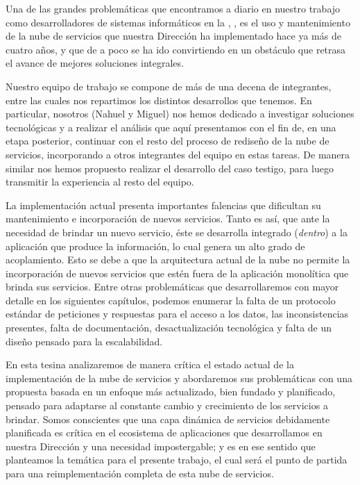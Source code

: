 Una de las grandes problemáticas que encontramos a diario en nuestro trabajo como desarrolladores de sistemas informáticos en la \direccionDesarrollo, \unlp, es el uso y mantenimiento de la nube de servicios que nuestra Dirección ha implementado hace ya más de cuatro años, y que de a poco se ha ido convirtiendo en un obstáculo que retrasa el avance de mejores soluciones integrales.

Nuestro equipo de trabajo se compone de más de una decena de integrantes, entre las cuales nos repartimos los distintos desarrollos que tenemos. En particular, nosotros (Nahuel y Miguel) nos hemos dedicado a investigar soluciones tecnológicas y a realizar el análisis que aquí presentamos con el fin de, en una etapa posterior, continuar con el resto del proceso de rediseño de la nube de servicios, incorporando a otros integrantes del equipo en estas tareas. De manera similar nos hemos propuesto realizar el desarrollo del caso testigo, para luego transmitir la experiencia al resto del equipo.

La implementación actual presenta importantes falencias que dificultan su mantenimiento e incorporación de nuevos servicios. Tanto es así, que ante la necesidad de brindar un nuevo servicio, éste se desarrolla integrado (\textit{dentro}) a la aplicación que produce la información, lo cual genera un alto grado de acoplamiento. Esto se debe a que la arquitectura actual de la nube no permite la incorporación de nuevos servicios que estén fuera de la aplicación monolítica que brinda sus servicios. Entre otras problemáticas que desarrollaremos con mayor detalle en los siguientes capítulos, podemos enumerar la falta de un protocolo estándar de peticiones y respuestas para el acceso a los datos, las inconsistencias presentes, falta de documentación, desactualización tecnológica y falta de un diseño pensado para la escalabilidad.

En esta tesina analizaremos de manera crítica el estado actual de la implementación de la nube de servicios y abordaremos sus problemáticas con una propuesta basada en un enfoque más actualizado, bien fundado y planificado, pensado para adaptarse al constante cambio y crecimiento de los servicios a brindar. Somos conscientes que una capa dinámica de servicios debidamente planificada es crítica en el ecosistema de aplicaciones que desarrollamos en nuestra Dirección y una necesidad impostergable; y es en ese sentido que planteamos la temática para el presente trabajo, el cual será el punto de partida para una reimplementación completa de esta nube de servicios.
